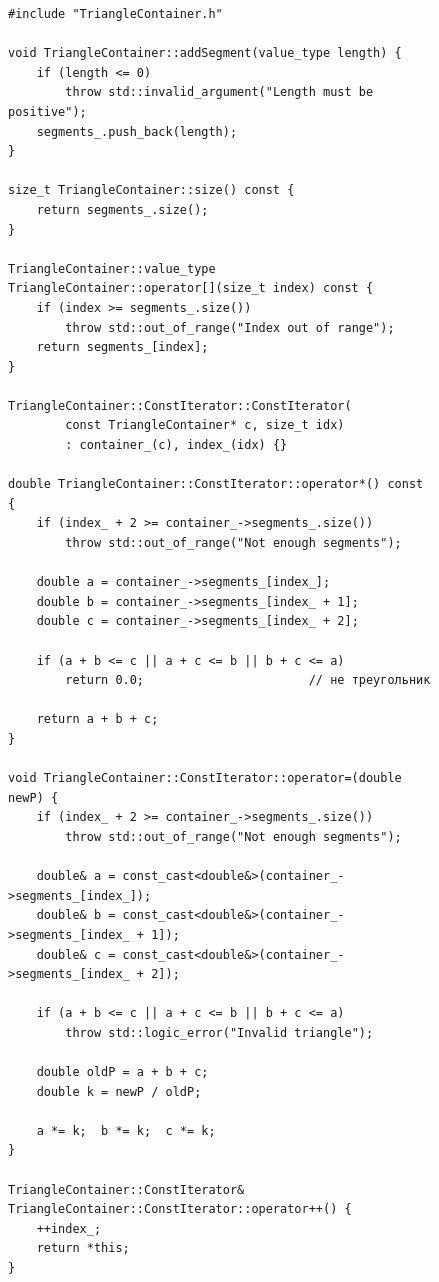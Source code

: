 \documentclass[a4paper, 14pt]{extarticle}
\begin{document}
\begin{figure}[!htb]
\begin{lstlisting}[caption={\texttt{TriangleContainer.cpp}, строки 1–70},label={lst:tri-impl-a},firstnumber=1,lastline=70]
#include "TriangleContainer.h"

void TriangleContainer::addSegment(value_type length) {
    if (length <= 0)
        throw std::invalid_argument("Length must be positive");
    segments_.push_back(length);
}

size_t TriangleContainer::size() const {
    return segments_.size();
}

TriangleContainer::value_type
TriangleContainer::operator[](size_t index) const {
    if (index >= segments_.size())
        throw std::out_of_range("Index out of range");
    return segments_[index];
}

TriangleContainer::ConstIterator::ConstIterator(
        const TriangleContainer* c, size_t idx)
        : container_(c), index_(idx) {}

double TriangleContainer::ConstIterator::operator*() const {
    if (index_ + 2 >= container_->segments_.size())
        throw std::out_of_range("Not enough segments");

    double a = container_->segments_[index_];
    double b = container_->segments_[index_ + 1];
    double c = container_->segments_[index_ + 2];

    if (a + b <= c || a + c <= b || b + c <= a)
        return 0.0;                       // не треугольник

    return a + b + c;
}

void TriangleContainer::ConstIterator::operator=(double newP) {
    if (index_ + 2 >= container_->segments_.size())
        throw std::out_of_range("Not enough segments");

    double& a = const_cast<double&>(container_->segments_[index_]);
    double& b = const_cast<double&>(container_->segments_[index_ + 1]);
    double& c = const_cast<double&>(container_->segments_[index_ + 2]);

    if (a + b <= c || a + c <= b || b + c <= a)
        throw std::logic_error("Invalid triangle");

    double oldP = a + b + c;
    double k = newP / oldP;

    a *= k;  b *= k;  c *= k;
}

TriangleContainer::ConstIterator&
TriangleContainer::ConstIterator::operator++() {
    ++index_;
    return *this;
}
\end{lstlisting}
\end{figure}
\clearpage
\end{document}
